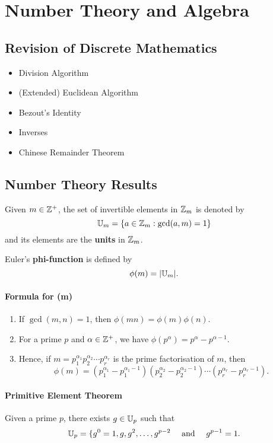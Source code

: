 \section{Number Theory and Algebra}
\subsection{Revision of Discrete Mathematics}
\begin{multicols}{2}
    \begin{itemize}
        \item Division Algorithm
        \item (Extended) Euclidean Algorithm
        \item Bezout's Identity
        \item Inverses
        \item Chinese Remainder Theorem
    \end{itemize}
\end{multicols}

\subsection{Number Theory Results}
Given \(m \in \mathbb{Z}^+\), the set of invertible elements in \(\mathbb{Z}_m\) is denoted by
\[\mathbb{U}_m = \{ a \in \mathbb{Z}_m : \gcd(a, m) = 1\}\]
and its elements are the \textbf{units} in \(\mathbb{Z}_m\).

Euler's \textbf{phi-function} is defined by
\[\phi(m) = |\mathbb{U}_m|.\]

\paragraph{Formula for \phi(m)}
\begin{enumerate}
    \item If \(\gcd(m, n) = 1\), then \(\phi(mn) = \phi(m)\phi(n)\).
    \item For a prime \(p\) and \(\alpha \in \mathbb{Z}^+\), we have \(\phi(p^\alpha) = p^\alpha - p^{\alpha - 1}\).
    \item Hence, if \(m = p_1^{\alpha_1}p_2^{\alpha_2} \cdots p_r^{\alpha_r}\) is the prime factorisation of \(m\), then
          \[\phi(m) = (p_1^{\alpha_1} - p_1^{\alpha_1 - 1})(p_2^{\alpha_2} - p_2^{\alpha_2 - 1}) \cdots (p_r^{\alpha_r} - p_r^{\alpha_r - 1}).\]
\end{enumerate}

\paragraph{Primitive Element Theorem}
Given a prime \(p\), there exists \(g \in \mathbb{U}_p\) such that
\[\mathbb{U}_p = \{g^0 = 1, g, g^2, \dots, g^{p - 2} \quad \text{ and } \quad g^{p - 1} = 1.\]

